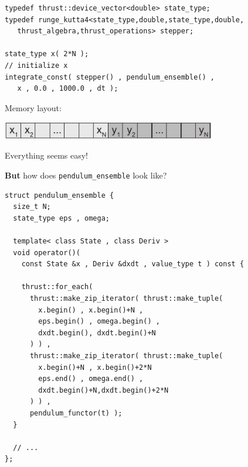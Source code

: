 \begin{frame}[fragile]


 \begin{lstlisting}[basicstyle=\scriptsize\ttfamily]
typedef thrust::device_vector<double> state_type;
typedef runge_kutta4<state_type,double,state_type,double,
   thrust_algebra,thrust_operations> stepper; 

state_type x( 2*N );
// initialize x
integrate_const( stepper() , pendulum_ensemble() ,
   x , 0.0 , 1000.0 , dt );
 \end{lstlisting}

\vspace{2ex}

\centerline{Memory layout:}

\vspace{1ex}

\centerline{\includegraphics[draft=false,width=0.7\textwidth]{memory_layout2.pdf}}

\vspace{6ex}

\centerline{Everything seems easy!}
\vspace{2ex}
\centerline{{\bf But} how does {\tt pendulum\_ensemble} look like?}
 

\end{frame}




\begin{frame}[fragile]


 \begin{lstlisting}[basicstyle=\scriptsize\ttfamily]
struct pendulum_ensemble {
  size_t N;
  state_type eps , omega;

  template< class State , class Deriv >
  void operator()(
    const State &x , Deriv &dxdt , value_type t ) const {
  
    thrust::for_each(
      thrust::make_zip_iterator( thrust::make_tuple(
        x.begin() , x.begin()+N , 
        eps.begin() , omega.begin() , 
        dxdt.begin(), dxdt.begin()+N 
      ) ) ,
      thrust::make_zip_iterator( thrust::make_tuple(
        x.begin()+N , x.begin()+2*N 
        eps.end() , omega.end() ,
        dxdt.begin()+N,dxdt.begin()+2*N
      ) ) ,
      pendulum_functor(t) );
  }

  // ...
};
 \end{lstlisting}


\end{frame}


